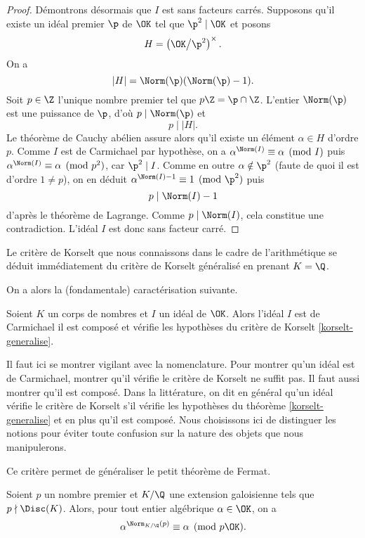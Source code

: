 \begin{proof}
	Démontrons désormais que $I$ est sans facteurs carrés. Supposons qu'il existe un idéal premier $\p$ de $\OK$ tel que $\p^2\mid \OK$ et posons \[H = \left(\OK\big/\p^2\right)^\times.\] On a \[\left|H\right| = \Norm(\p)(\Norm(\p) - 1).\] Soit $p\in \Z$ l'unique nombre premier tel que $p\Z = \p\cap \Z$. L'entier $\Norm(\p)$ est une puissance de $\p$, d'où $p\mid \Norm(\p)$ et \[p\mid \left| H \right|.\] Le théorème de Cauchy abélien assure alors qu'il existe un élément $\alpha \in H$ d'ordre $p$. Comme $I$ est de Carmichael par hypothèse, on a $\alpha^{\Norm(I)}\equiv \alpha \pmod{I}$ puis $\alpha^{\Norm(I)} \equiv \alpha \pmod{p^2}$, car $\p^2\mid I$. Comme en outre $\alpha\notin \p^2$ (faute de quoi il est d'ordre $1\neq p$), on en déduit $\alpha^{\Norm(I) - 1} \equiv 1 \pmod{\p^2}$ puis \[p \mid \Norm(I) - 1\] d'après le théorème de Lagrange. Comme $p\mid \Norm(I)$, cela constitue une contradiction. L'idéal $I$ est donc sans facteur carré.
\end{proof}

\begin{remarque}
	Le critère de Korselt que nous connaissons dans le cadre de l'arithmétique se déduit immédiatement du critère de Korselt généralisé en prenant $K=\Q$.
\end{remarque}

On a alors la (fondamentale) caractérisation suivante.

\begin{corollaire}\label{carac-korselt}
	Soient $K$ un corps de nombres et $I$ un idéal de $\OK$. Alors l'idéal $I$ est de Carmichael \ssi il est composé et vérifie les hypothèses du critère de Korselt \ref{korselt-generalise}.
\end{corollaire}

\begin{remarque}
	Il faut ici se montrer vigilant avec la nomenclature. Pour montrer qu'un idéal est de Carmichael, montrer qu'il vérifie le critère de Korselt ne suffit pas. Il faut aussi montrer qu'il est composé. Dans la littérature, on dit en général qu'un idéal vérifie le critère de Korselt s'il vérifie les hypothèses du théorème \ref{korselt-generalise} et en plus qu'il est composé. Nous choisissons ici de distinguer les notions pour éviter toute confusion sur la nature des objets que nous manipulerons.
\end{remarque}

Ce critère permet de généraliser le petit théorème de Fermat.

\begin{theoreme}\label{ptf}
	Soient $p$ un nombre premier et $K/\Q$ une extension galoisienne tels que $p\nmid \Disc(K)$. Alors, pour tout entier algébrique $\alpha \in \OK$, on a $$\alpha^{\Norm_{K/\Q}(p)} \equiv \alpha \pmod{p\OK}.$$
\end{theoreme}

